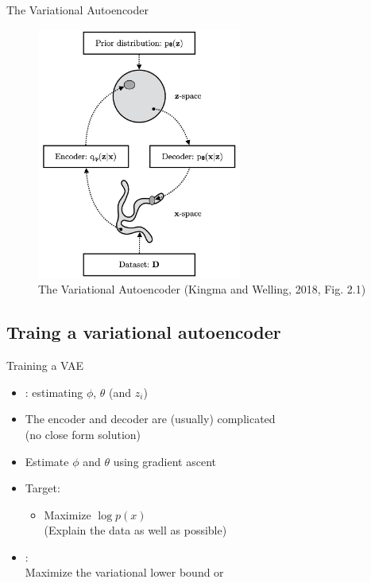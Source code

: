 \documentclass[10pt]{beamer}
\begin{document}
\begin{frame}{The Variational Autoencoder}

\begin{figure}[h]
\centering
\includegraphics[width=0.6\textwidth]{fig/Kingma_Welling_2018_Fig_2_1.png}
\caption{The Variational Autoencoder (Kingma and Welling, 2018, Fig. 2.1)}
\end{figure}
\end{frame}

\subsection{Traing a variational autoencoder}

\begin{frame}{Training a VAE}
\begin{itemize}
\item {}: estimating $\phi$, $\theta$ (and $z_i$)
\pause
\item The encoder and decoder are (usually) complicated \\ (no close form solution)
\item Estimate $\phi$ and $\theta$ using gradient ascent
\pause
\item Target:
\begin{itemize}
\item Maximize $\log p(x)$\\(Explain the data as well as possible)
\end{itemize}\pause
\item {}: \\Maximize the variational lower bound or 
\end{itemize}
\end{frame}
\end{document}
